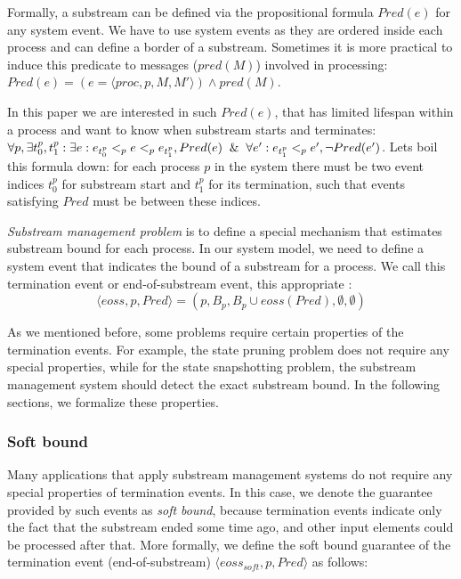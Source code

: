 Formally, a substream can be defined via the propositional formula $Pred(e)$ for any system event. We have to use system events as they are ordered inside each process and can define a border of a substream. Sometimes it is more practical to induce this predicate to messages ($pred(M)$) involved in processing: $Pred(e) = (e = \langle proc, p, M, M'\rangle) \wedge pred(M)$.

In this paper we are interested in such $Pred(e)$, that has limited lifespan within a process and want to know when substream starts and terminates: $\forall p, \exists t_0^p, t_1^p: \exists e: e_{t_0^p} <_p e <_p e_{t_1^p}, Pred(e) \And \forall e': e_{t_1^p} <_p e', \neg Pred(e')$. Lets boil this formula down: for each process $p$ in the system there must be two event indices $t_0^p$ for substream start and $t_1^p$ for its termination, such that events satisfying $Pred$ must be between these indices. 

{\em Substream management problem} is to define a special mechanism that estimates substream bound for each process. In our system model, we need to define a system event that indicates the bound of a substream for a process. We call this termination event or end-of-substream event, this appropriate :
\begin{equation}
  \langle eoss, p, Pred \rangle = (p, B_p, B_p\cup eoss(Pred), \emptyset, \emptyset)  
\end{equation}

As we mentioned before, some problems require certain properties of the termination events. For example, the state pruning problem does not require any special properties, while for the state snapshotting problem, the substream management system should detect the exact substream bound. In the following sections, we formalize these properties. 

\subsubsection{Soft bound}

Many applications that apply substream management systems do not require any special properties of termination events. In this case, we denote the guarantee provided by such events as {\em soft bound}, because termination events indicate only the fact that the substream ended some time ago, and other input elements could be processed after that. More formally, we define the soft bound guarantee of the termination event (end-of-substream) $\langle eoss_{soft}, p, Pred\rangle$ as follows:

